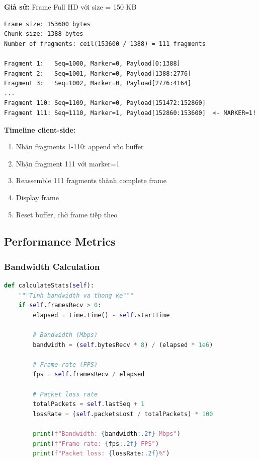 \textbf{Giả sử:} Frame Full HD với size = 150 KB

\begin{lstlisting}[caption={Fragmentation Example}]
Frame size: 153600 bytes
Chunk size: 1388 bytes
Number of fragments: ceil(153600 / 1388) = 111 fragments

Fragment 1:   Seq=1000, Marker=0, Payload[0:1388]
Fragment 2:   Seq=1001, Marker=0, Payload[1388:2776]
Fragment 3:   Seq=1002, Marker=0, Payload[2776:4164]
...
Fragment 110: Seq=1109, Marker=0, Payload[151472:152860]
Fragment 111: Seq=1110, Marker=1, Payload[152860:153600]  <- MARKER=1!
\end{lstlisting}

\textbf{Timeline client-side:}
\begin{enumerate}
    \item Nhận fragments 1-110: append vào buffer
    \item Nhận fragment 111 với marker=1
    \item Reassemble 111 fragments thành complete frame
    \item Display frame
    \item Reset buffer, chờ frame tiếp theo
\end{enumerate}

\subsection{Performance Metrics}

\subsubsection{Bandwidth Calculation}

\begin{lstlisting}[language=Python, caption={Calculate Statistics}]
def calculateStats(self):
    """Tinh bandwidth va thong ke"""
    if self.framesRecv > 0:
        elapsed = time.time() - self.startTime
        
        # Bandwidth (Mbps)
        bandwidth = (self.bytesRecv * 8) / (elapsed * 1e6)
        
        # Frame rate (FPS)
        fps = self.framesRecv / elapsed
        
        # Packet loss rate
        totalPackets = self.lastSeq + 1
        lossRate = (self.packetsLost / totalPackets) * 100
        
        print(f"Bandwidth: {bandwidth:.2f} Mbps")
        print(f"Frame rate: {fps:.2f} FPS")
        print(f"Packet loss: {lossRate:.2f}%")
\end{lstlisting}

